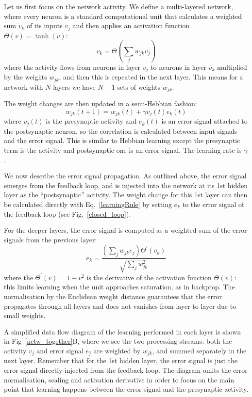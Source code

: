 \documentclass{llncs}
\begin{document}
Let us first focus on the network activity. We
define a multi-layered network, where every neuron is a standard
computational unit that calculates a weighted sum $v_k$ of its inputs $v_j$ and
then applies an activation function $\Theta(v) = \tanh(v)$:
\begin{equation}
  v_k = \Theta\left( \sum_j w_{jk} v_{j} \right) \label{act_sum}
\end{equation}
where the activity flows from neurons in layer $v_j$ to neurons in
layer $v_k$ multiplied by the weights $w_{jk}$, and then this
is repeated in the next layer. This means for a network with
$N$ layers we have $N-1$ sets of weights $w_{jk}$.

The weight changes are then updated in a semi-Hebbian fashion:
\begin{equation}
  w_{jk}(t+1) = w_{jk}(t) + \gamma v_j(t)  e_k(t) \label{learningRule}
\end{equation}
where $v_j(t)$ is the presynaptic activity and $e_k(t)$ is an error signal
attached to the postsynaptic neuron, so the correlation is
calculated between input signals and the error signal. This is
similar to Hebbian learning except the presynaptic term is the
activity and postsynaptic one is an error signal. The learning rate is $\gamma$.


We now describe the error signal propagation. As outlined above, the
error signal emerges from the feedback loop, and is injected into the
network at its 1st hidden layer as the ``postsynaptic'' activity. The
weight change for this 1st layer can then be calculated directly with
Eq.~\ref{learningRule} by setting $e_k$ to the error signal of the
feedback loop (see Fig.~\ref{closed_loop}).

For the deeper layers, the error signal is computed as a weighted
sum of the error signals from the previous layer:
\begin{equation}
  e_k = \frac{\left( \sum_j w_{jk} e_{j} \right) \Theta^\prime (v_k) }{\sqrt{\sum_j w_{jk}^2}}
\end{equation}
where the $\Theta^\prime (v) = 1 - v^2$ is the derivative of the activation
function $\Theta(v)$: this limits learning when the unit approaches saturation,
as in backprop. The normalisation by the Euclidean weight
distance guarantees that the error propagates through all layers and does 
not vanishes from layer to layer due to small weights.

A simplified data flow diagram of the learning performed in each layer
is shown in Fig~\ref{netw_together}B, where we see the two processing
streams: both the activity $v_j$ and error signal $e_j$ are weighted
by $w_{jk}$, and summed separately in the next layer.  Remember that
for the 1st hidden layer, the error signal is just the error signal
directly injected from the feedback loop. The diagram omits the error
normalisation, scaling and activation derivative in order to focus on
the main point that learning happens between the error signal and the
presynaptic activity.
\end{document}
